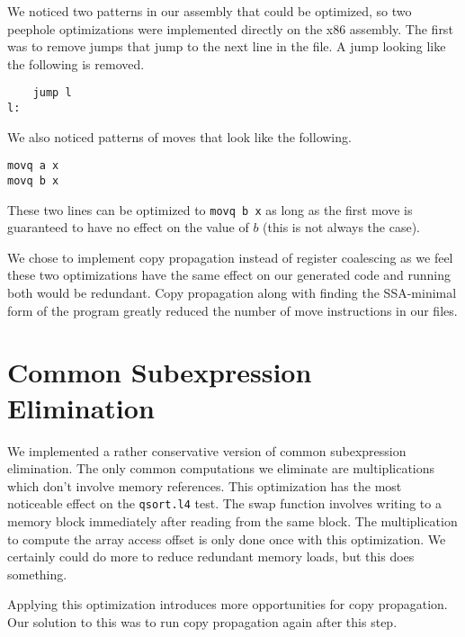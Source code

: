 \documentclass[aps,letterpaper,11pt]{revtex4}
\begin{document}
We noticed two patterns in our assembly that could be optimized, so two peephole optimizations were implemented
directly on the x86 assembly. The first was to remove jumps that jump to the next line in the file. A jump
looking like the following is removed.

\begin{verbatim}
    jump l
l:
\end{verbatim}

We also noticed patterns of moves that look like the following.

\begin{verbatim}
movq a x
movq b x
\end{verbatim}

These two lines can be optimized to \texttt{movq b x} as long as the first move is guaranteed to have no effect
on the value of $b$ (this is not always the case).

We chose to implement copy propagation instead of register coalescing as we feel these two optimizations have
the same effect on our generated code and running both would be redundant. Copy propagation along with finding
the SSA-minimal form of the program greatly reduced the number of move instructions in our files.

\section{Common Subexpression Elimination}
We implemented a rather conservative version of common subexpression elimination. The only common computations
we eliminate are multiplications which don't involve memory references. This optimization has the most noticeable
effect on the \texttt{qsort.l4} test. The swap function involves writing to a memory block immediately after
reading from the same block. The multiplication to compute the array access offset is only done once with this
optimization. We certainly could do more to reduce redundant memory loads, but this does something.

Applying this optimization introduces more opportunities for copy propagation. Our solution to this was to
run copy propagation again after this step.
\end{document}
